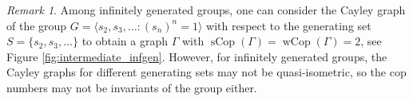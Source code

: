 \documentclass{amsart}
\theoremstyle{definition}
\theoremstyle{remark}
\newtheorem{remark}[theorem]{Remark}
\theoremstyle{remark}
\theoremstyle{definition}
\newcommand{\sCop}{\operatorname{sCop}}
\newcommand{\wCop}{\operatorname{wCop}}
\begin{document}
\begin{remark}
Among infinitely generated groups, one can consider the Cayley graph of the group $G = \langle s_2, s_3, \ldots \colon (s_n)^n = 1 \rangle$ with respect to the generating set $S = \{s_2, s_3, \ldots \}$ to obtain a graph $\Gamma$ with $\sCop(\Gamma) = \wCop(\Gamma) = 2$, see Figure \ref{fig:intermediate_infgen}. However, for infinitely generated groups, the Cayley graphs for different generating sets may not be quasi-isometric, so the cop numbers may not be invariants of the group either.
\end{remark}

\newpage





\end{document}
